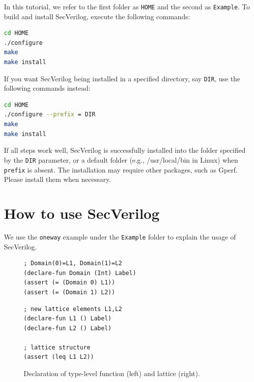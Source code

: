 \documentclass [12pt, oneside, a4paper]{article}
\newcommand{\code}[1]{\texttt{#1}}
\begin{document}
In this tutorial, we refer to the first folder as \code{HOME} and the
second as \code{Example}. To build and install SecVerilog, execute the
following commands:

\begin{lstlisting}[language=bash, frame=none, numbers=none,
keywordstyle=\footnotesize\bfseries, morekeywords={make}]
cd HOME
./configure
make
make install
\end{lstlisting}

If you want SecVerilog being installed in a specified directory, say
\code{DIR}, use the following commands instead:

\begin{lstlisting}[language=bash, frame=none, numbers=none,
keywordstyle=\footnotesize\bfseries, morekeywords={make}]
cd HOME
./configure --prefix = DIR
make
make install
\end{lstlisting}

If all steps work well, SecVerilog is successfully installed
into the folder specified by the \code{DIR} parameter, or a default
folder (e.g., /usr/local/bin in Linux) when \code{prefix} is absent.
The installation may require other packages, such as Gperf.  Please
install them when necessary.

\section{How to use SecVerilog}
\label{sec:usage}

We use the \code{oneway} example under the \code{Example} folder to
explain the usage of SecVerilog.

\begin{figure}
\begin{minipage}{.5\linewidth}
\begin{lstlisting}[framexbottommargin=25pt, language=z3, numbers=none,
framexleftmargin=0pt, xleftmargin=0pt]
; Domain(0)=L1, Domain(1)=L2
(declare-fun Domain (Int) Label)
(assert (= (Domain 0) L1))
(assert (= (Domain 1) L2))
\end{lstlisting}
\end{minipage}
\hfill
\begin{minipage}{.45\linewidth}
\begin{lstlisting}[language=z3, numbers=none,
framexleftmargin=0pt, xleftmargin=0pt]
; new lattice elements L1,L2
(declare-fun L1 () Label)
(declare-fun L2 () Label)

; lattice structure
(assert (leq L1 L2))
\end{lstlisting}
\end{minipage}
\caption{Declaration of type-level function (left) and lattice (right).}
\label{fig:oneway}
\end{figure}
\end{document}
